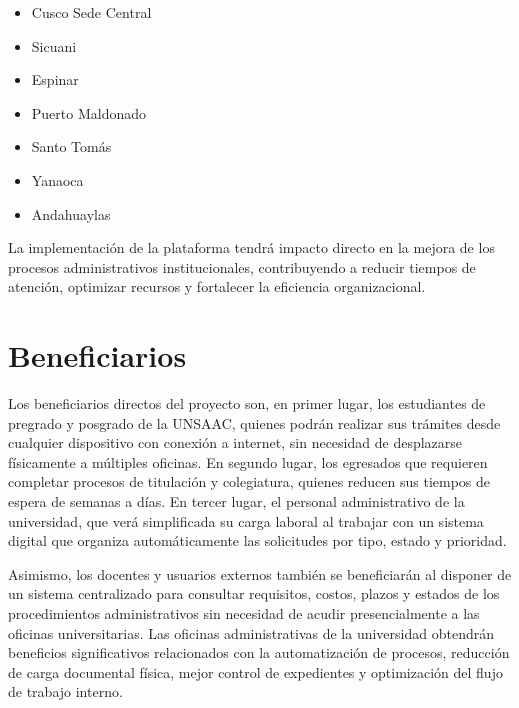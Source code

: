 \begin{itemize}
    \item Cusco Sede Central
    \item Sicuani
    \item Espinar
    \item Puerto Maldonado
    \item Santo Tomás
    \item Yanaoca
    \item Andahuaylas
\end{itemize}

La implementación de la plataforma tendrá impacto directo en la mejora de los procesos administrativos 
institucionales, contribuyendo a reducir tiempos de atención, optimizar recursos y fortalecer la eficiencia 
organizacional.

\section{Beneficiarios}

Los beneficiarios directos del proyecto son, en primer lugar, los estudiantes de pregrado y posgrado de 
la UNSAAC, quienes podrán realizar sus trámites desde cualquier dispositivo con conexión a internet, sin 
necesidad de desplazarse físicamente a múltiples oficinas. En segundo lugar, los egresados que requieren 
completar procesos de titulación y colegiatura, quienes reducen sus tiempos de espera de semanas a días. 
En tercer lugar, el personal administrativo de la universidad, que verá simplificada su carga laboral al 
trabajar con un sistema digital que organiza automáticamente las solicitudes por tipo, estado y prioridad.

Asimismo, los docentes y usuarios externos también se beneficiarán al disponer de un sistema centralizado 
para consultar requisitos, costos, plazos y estados de los procedimientos administrativos sin necesidad de 
acudir presencialmente a las oficinas universitarias. Las oficinas administrativas de la universidad obtendrán 
beneficios significativos relacionados con la automatización de procesos, reducción de carga documental física, 
mejor control de expedientes y optimización del flujo de trabajo interno.

